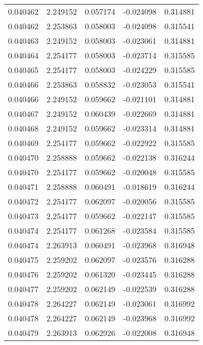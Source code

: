 \begin{tabular}{lrrrr}
0.040462    &  2.249152 &  0.057174 & -0.024098 &             0.314881 \\
0.040462    &  2.253863 &  0.058003 & -0.024098 &             0.315541 \\
0.040463    &  2.249152 &  0.058003 & -0.023061 &             0.314881 \\
0.040464    &  2.254177 &  0.058003 & -0.023714 &             0.315585 \\
0.040465    &  2.254177 &  0.058003 & -0.024229 &             0.315585 \\
0.040466    &  2.253863 &  0.058832 & -0.023053 &             0.315541 \\
0.040466    &  2.249152 &  0.059662 & -0.021101 &             0.314881 \\
0.040467    &  2.249152 &  0.060439 & -0.022669 &             0.314881 \\
0.040468    &  2.249152 &  0.059662 & -0.023314 &             0.314881 \\
0.040469    &  2.254177 &  0.059662 & -0.022922 &             0.315585 \\
0.040470    &  2.258888 &  0.059662 & -0.022138 &             0.316244 \\
0.040470    &  2.254177 &  0.059662 & -0.020048 &             0.315585 \\
0.040471    &  2.258888 &  0.060491 & -0.018619 &             0.316244 \\
0.040472    &  2.254177 &  0.062097 & -0.020056 &             0.315585 \\
0.040473    &  2.254177 &  0.059662 & -0.022147 &             0.315585 \\
0.040474    &  2.254177 &  0.061268 & -0.023584 &             0.315585 \\
0.040474    &  2.263913 &  0.060491 & -0.023968 &             0.316948 \\
0.040475    &  2.259202 &  0.062097 & -0.023576 &             0.316288 \\
0.040476    &  2.259202 &  0.061320 & -0.023445 &             0.316288 \\
0.040477    &  2.259202 &  0.062149 & -0.022539 &             0.316288 \\
0.040478    &  2.264227 &  0.062149 & -0.023061 &             0.316992 \\
0.040478    &  2.264227 &  0.062149 & -0.023968 &             0.316992 \\
0.040479    &  2.263913 &  0.062926 & -0.022008 &             0.316948 \\

\end{tabular}
